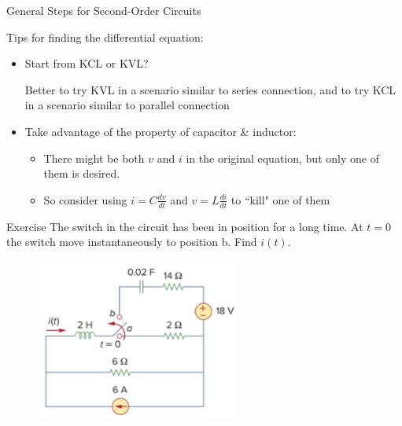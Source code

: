\documentclass{beamer}
\begin{document}
\begin{frame}{General Steps for Second-Order Circuits}

Tips for finding the differential equation:
\begin{itemize}
    \item Start from KCL or KVL?

    Better to try KVL in a scenario similar to series connection, and to try KCL in a scenario similar to parallel connection
    
    \item Take advantage of the property of capacitor \& inductor:
    \begin{itemize}
        \item There might be both $v$ and $i$ in the original equation, but only one of them is desired.
    
        \item So consider using $i=C\frac{dv}{dt}$ and $v=L\frac{di}{dt}$ to ``kill" one of them
    \end{itemize}
    
\end{itemize}

    
\end{frame}


\begin{frame}{Exercise}
The switch in the circuit has been in position for a long time. At $t=0$ the switch move instantaneously to position b. Find $i(t)$.
\begin{figure}
\centering
\includegraphics[width=0.6\textwidth]{img_2order/ex.png}
\end{figure}

\end{frame}

    
\end{document}
